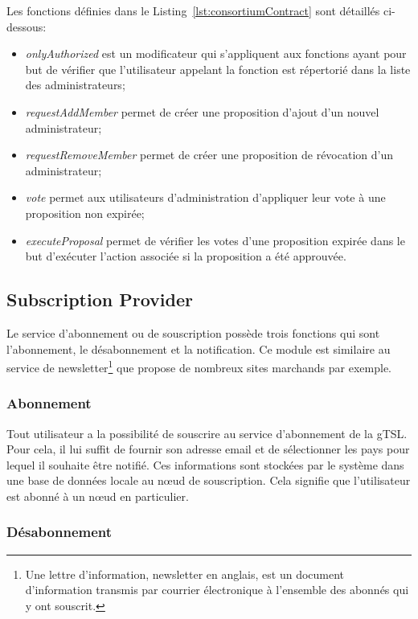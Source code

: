 \documentclass{tnreport}
\begin{document}
Les fonctions définies dans le Listing~\ref{lst:consortiumContract} sont détaillés ci-dessous:
\begin{itemize}
	\item \textit{onlyAuthorized} est un modificateur qui s'appliquent aux fonctions ayant pour but de vérifier que l'utilisateur appelant la fonction est répertorié dans la liste des administrateurs;
	\item \textit{requestAddMember} permet de créer une proposition d'ajout d'un nouvel administrateur;
	\item \textit{requestRemoveMember} permet de créer une proposition de révocation d'un administrateur;
	\item \textit{vote} permet aux utilisateurs d'administration d'appliquer leur vote à une proposition non expirée;
	\item \textit{executeProposal} permet de vérifier les votes d'une proposition expirée dans le but d'exécuter l'action associée si la proposition a été approuvée.
\end{itemize}

\subsection{Subscription Provider}

Le service d'abonnement ou de souscription possède trois fonctions qui sont l'abonnement, le désabonnement et la notification. Ce module est similaire au service de newsletter\footnote{Une lettre d'information, newsletter en anglais, est un document d'information transmis par courrier électronique à l'ensemble des abonnés qui y ont souscrit.} que propose de nombreux sites marchands par exemple.

\subsubsection{Abonnement}

Tout utilisateur a la possibilité de souscrire au service d'abonnement de la gTSL. Pour cela, il lui suffit de fournir son adresse email et de sélectionner les pays pour lequel il souhaite être notifié. Ces informations sont stockées par le système dans une base de données locale au nœud de souscription. Cela signifie que l'utilisateur est abonné à un nœud en particulier.

\subsubsection{Désabonnement}
\end{document}
